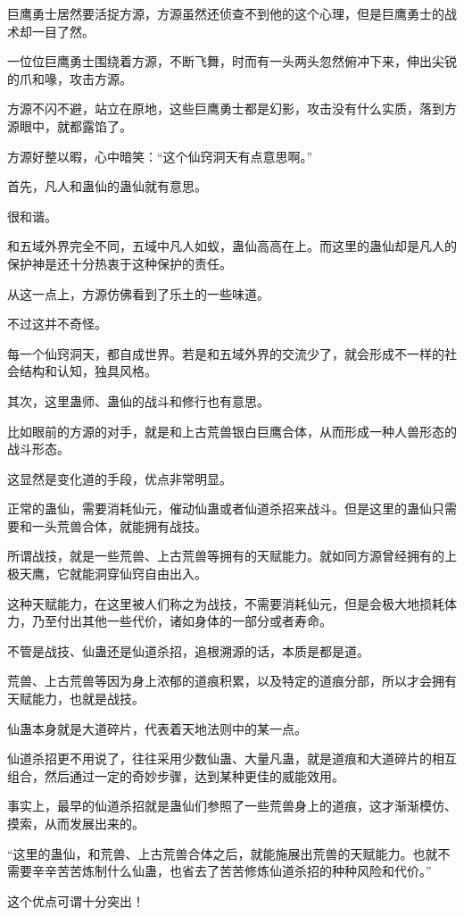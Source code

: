 \begin{this_body}
巨鹰勇士居然要活捉方源，方源虽然还侦查不到他的这个心理，但是巨鹰勇士的战术却一目了然。

一位位巨鹰勇士围绕着方源，不断飞舞，时而有一头两头忽然俯冲下来，伸出尖锐的爪和喙，攻击方源。

方源不闪不避，站立在原地，这些巨鹰勇士都是幻影，攻击没有什么实质，落到方源眼中，就都露馅了。

方源好整以暇，心中暗笑：“这个仙窍洞天有点意思啊。”

首先，凡人和蛊仙的蛊仙就有意思。

很和谐。

和五域外界完全不同，五域中凡人如蚁，蛊仙高高在上。而这里的蛊仙却是凡人的保护神是还十分热衷于这种保护的责任。

从这一点上，方源仿佛看到了乐土的一些味道。

不过这并不奇怪。

每一个仙窍洞天，都自成世界。若是和五域外界的交流少了，就会形成不一样的社会结构和认知，独具风格。

其次，这里蛊师、蛊仙的战斗和修行也有意思。

比如眼前的方源的对手，就是和上古荒兽银白巨鹰合体，从而形成一种人兽形态的战斗形态。

这显然是变化道的手段，优点非常明显。

正常的蛊仙，需要消耗仙元，催动仙蛊或者仙道杀招来战斗。但是这里的蛊仙只需要和一头荒兽合体，就能拥有战技。

所谓战技，就是一些荒兽、上古荒兽等拥有的天赋能力。就如同方源曾经拥有的上极天鹰，它就能洞穿仙窍自由出入。

这种天赋能力，在这里被人们称之为战技，不需要消耗仙元，但是会极大地损耗体力，乃至付出其他一些代价，诸如身体的一部分或者寿命。

不管是战技、仙蛊还是仙道杀招，追根溯源的话，本质是都是道。

荒兽、上古荒兽等因为身上浓郁的道痕积累，以及特定的道痕分部，所以才会拥有天赋能力，也就是战技。

仙蛊本身就是大道碎片，代表着天地法则中的某一点。

仙道杀招更不用说了，往往采用少数仙蛊、大量凡蛊，就是道痕和大道碎片的相互组合，然后通过一定的奇妙步骤，达到某种更佳的威能效用。

事实上，最早的仙道杀招就是蛊仙们参照了一些荒兽身上的道痕，这才渐渐模仿、摸索，从而发展出来的。

“这里的蛊仙，和荒兽、上古荒兽合体之后，就能施展出荒兽的天赋能力。也就不需要辛辛苦苦炼制什么仙蛊，也省去了苦苦修炼仙道杀招的种种风险和代价。”

这个优点可谓十分突出！


\end{this_body}
